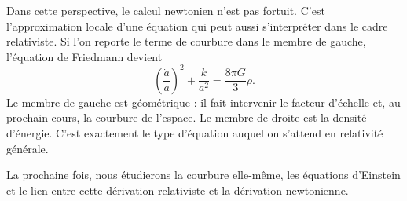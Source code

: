 Dans cette perspective, le calcul newtonien n’est pas fortuit. C’est l’approximation locale d’une équation qui peut aussi s’interpréter dans le cadre relativiste. Si l’on reporte le terme de courbure dans le membre de gauche, l’équation de Friedmann devient
\begin{equation}
\left(\frac{\dot a}{a}\right)^2+\frac{k}{a^2}=\frac{8\pi G}{3}\rho.
\end{equation}
Le membre de gauche est géométrique : il fait intervenir le facteur d’échelle et, au prochain cours, la courbure de l’espace. Le membre de droite est la densité d’énergie. C’est exactement le type d’équation auquel on s’attend en relativité générale.

La prochaine fois, nous étudierons la courbure elle-même, les équations d’Einstein et le lien entre cette dérivation relativiste et la dérivation newtonienne.
